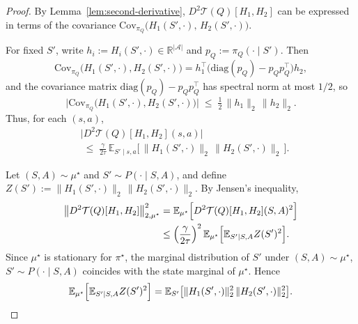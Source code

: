 \documentclass{article}
\newcommand{\Cov}{\mathrm{Cov}}
\theoremstyle{plain}
\theoremstyle{definition}
\theoremstyle{remark}
\newcommand{\E}{\mathbb{E}}
\begin{document}
\begin{proof}
By Lemma~\ref{lem:second-derivative},
\(D^2\mathcal{T}(Q)[H_1,H_2]\) can be expressed in terms of the covariance
\(\Cov_{\pi_Q}\bigl(H_1(S',\cdot),\, H_2(S',\cdot)\bigr)\).


For fixed $S'$, write $h_i := H_i(S',\cdot)\in\mathbb{R}^{|\mathcal A|}$ and
$p_Q := \pi_Q(\cdot\mid S')$. Then
\[
\Cov_{\pi_Q}\bigl(H_1(S',\cdot),H_2(S',\cdot)\bigr)
=
h_1^\top\bigl(\mathrm{diag}(p_Q) - p_Q p_Q^\top\bigr)h_2,
\]
and the covariance matrix
$\mathrm{diag}(p_Q) - p_Q p_Q^\top$ has spectral norm at most $1/2$, so
\[
\bigl|\Cov_{\pi_Q}\bigl(H_1(S',\cdot),H_2(S',\cdot)\bigr)\bigr|
\;\le\;
\tfrac12\,\|h_1\|_2\,\|h_2\|_2.
\]
Thus, for each $(s,a)$,
\begin{align*}
  &  \bigl|D^2\mathcal{T}(Q)[H_1,H_2](s,a)\bigr|\\
&\;\le\;
\frac{\gamma}{2\tau}\,
\E_{S'\mid s,a}
\bigl[\,\|H_1(S',\cdot)\|_2\,\|H_2(S',\cdot)\|_2\,\bigr].
\end{align*}



Let $(S,A)\sim\mu^\star$ and $S'\sim P(\cdot\mid S,A)$, and define
$Z(S') := \|H_1(S',\cdot)\|_2\,\|H_2(S',\cdot)\|_2$.
By Jensen's inequality,
\begin{align*}
\bigl\|D^2\mathcal{T}(Q)[H_1,H_2]\bigr\|_{2,\mu^\star}^2
&=
\E_{\mu^\star}\Bigl[
  D^2\mathcal{T}(Q)[H_1,H_2](S,A)^2
\Bigr]
\\
&\le
\left(\frac{\gamma}{2\tau}\right)^2
\E_{\mu^\star}
\Bigl[
  \E_{S'\mid S,A} Z(S')^2
\Bigr].
\end{align*}
Since $\mu^\star$ is stationary for $\pi^\star$, the marginal distribution of
$S'$ under $(S,A)\sim\mu^\star$, $S'\sim P(\cdot\mid S,A)$ coincides with the
state marginal of $\mu^\star$. Hence
\[
\E_{\mu^\star}
\Bigl[
  \E_{S'\mid S,A} Z(S')^2
\Bigr]
=
\E_{S'}\bigl[
  \|H_1(S',\cdot)\|_2^2\,\|H_2(S',\cdot)\|_2^2
\bigr].
\]


\end{proof}
\end{document}
